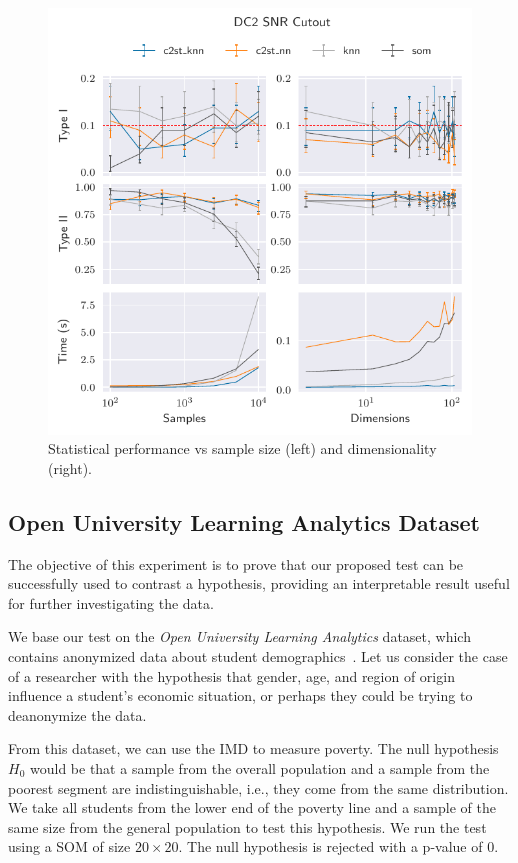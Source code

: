 \begin{figure}[htbp]
    \centering
    \includegraphics{images/6_som/dc2_snr}
    \caption[Statistical performance vs sample size and dimensionality (DC2 Signal to Noise).]{
    Statistical performance vs sample size (left) and dimensionality (right).}
    \label{fig:dc2_snr}
\end{figure}

\subsection{Open University Learning Analytics Dataset}
\label{subsec:som_oulad}
The objective of this experiment is to prove that our proposed test can be successfully
used to contrast a hypothesis, providing an interpretable result useful for further
investigating the data.

We base our test on the \emph{Open University Learning Analytics}
dataset, which contains anonymized data about student demographics~\cite{kuzilek_open_2017}.
Let us consider the case of a researcher with the hypothesis that gender, age, and
region of origin influence a student's economic situation, or perhaps they could
be trying to deanonymize the data.

From this dataset, we can use the \gls{IMD} to measure poverty.
The null hypothesis $H_0$ would be that a sample from the overall population and a sample from
the poorest segment are indistinguishable, i.e., they come from the same distribution.
We take all students from the lower end of the poverty line and a sample of the same size
from the general population to test this hypothesis. We run the test using a \gls{SOM}  of size
$20\times20$. The null hypothesis is rejected with a p-value of $0$.

